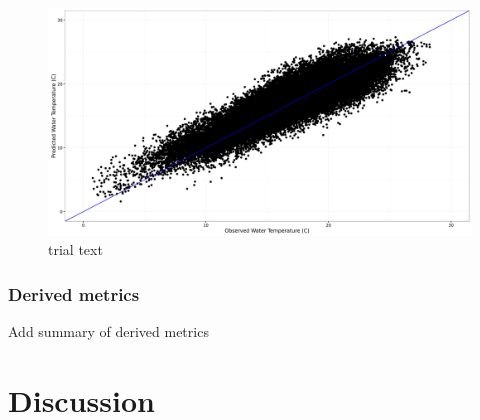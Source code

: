 \begin{figure}[htbp]
\centering
\includegraphics{Figures/validation_plot.jpg}
\caption{trial text}
\end{figure}

\subsubsection{Derived metrics}\label{derived-metrics-1}

Add summary of derived metrics

\section{Discussion}\label{discussion}

